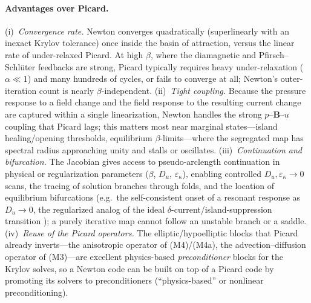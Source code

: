 \documentclass[english]{article}
\newcommand{\bB}{\mathbf{B}}
\begin{document}
\paragraph{Advantages over Picard.}
(i)~\emph{Convergence rate.} Newton converges quadratically (superlinearly with an inexact Krylov
tolerance) once inside the basin of attraction, versus the linear rate of under-relaxed Picard. At
high $\beta$, where the diamagnetic and Pfirsch--Schl\"uter feedbacks are strong, Picard typically
requires heavy under-relaxation ($\alpha\ll1$) and many hundreds of cycles, or fails to converge at
all; Newton's outer-iteration count is nearly $\beta$-independent. (ii)~\emph{Tight coupling.}
Because the pressure response to a field change and the field response to the resulting current
change are captured within a single linearization, Newton handles the strong $p$--$\bB$--$u$
coupling that Picard lags; this matters most near marginal states---island healing/opening
thresholds, equilibrium $\beta$-limits---where the segregated map has spectral radius approaching
unity and stalls or oscillates. (iii)~\emph{Continuation and bifurcation.} The Jacobian gives access
to pseudo-arclength continuation in physical or regularization parameters
($\beta$, $D_u$, $\varepsilon_\kappa$), enabling controlled $D_u,\varepsilon_\kappa\!\to\!0$ scans,
the tracing of solution branches through folds, and the location of equilibrium bifurcations
(e.g.\ the self-consistent onset of a resonant response as $D_u\to0$, the regularized analog of the
ideal $\delta$-current/island-suppression transition \cite{loizu2015a,loizu2015b}); a purely
iterative map cannot follow an unstable branch or a saddle. (iv)~\emph{Reuse of the Picard
operators.} The elliptic/hypoelliptic blocks that Picard already inverts---the anisotropic
operator of (M4)/(M4a), the advection--diffusion operator of (M3)---are excellent physics-based
\emph{preconditioner} blocks for the Krylov solves, so a Newton code can be built on top of a Picard
code by promoting its solvers to preconditioners (``physics-based'' or nonlinear preconditioning).
\end{document}
